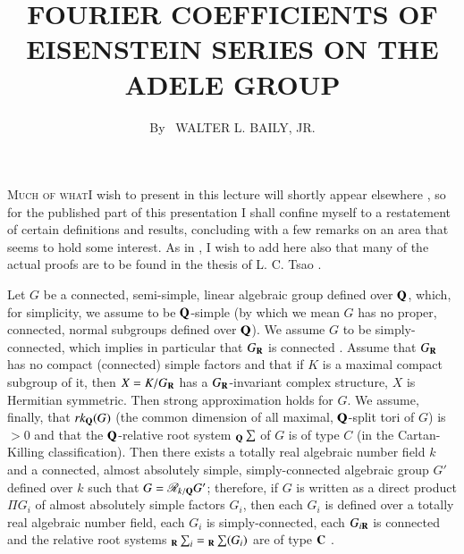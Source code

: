 \title{FOURIER COEFFICIENTS OF EISENSTEIN SERIES ON THE ADELE GROUP}

\author{By~ WALTER L. BAILY, JR.}

\date{}
\maketitle

\textsc{Much of what}\pageoriginale I wish to present in this lecture will shortly appear elsewhere \cite{art1-key3}, so for the published part of this presentation I shall confine myself to a restatement of certain definitions and results, concluding with a few remarks on an area that seems to hold some interest. As in \cite{art1-key3}, I wish to add here also that many of the actual proofs are to be found in the thesis of L. C. Tsao  \cite{art1-key8}.

Let $G$ be a connected, semi-simple, linear algebraic group defined over $\mathbf{Q}$, which, for simplicity, we assume to be $\mathbf{Q}$-simple (by which we mean $G$ has no proper, connected, normal subgroups defined over $\mathbf{Q}$). We assume $G$ to be simply-connected, which implies in particular that $G_{\mathbf{R}}$ is connected \citep[Ch. 7, \S 5]{art1-key}. Assume that $G_{\mathbf{R}}$ has no compact (connected) simple factors and that if $K$ is a maximal compact subgroup of it, then $X=K/G_{\mathbf{R}}$ has a $G_{\mathbf{R}}$-invariant complex structure, \iec $X$ is Hermitian symmetric. Then \cite{art1-key6} strong approximation holds for $G$. We assume, finally, that $rk_{\mathbf{Q}}(G)$ (the common dimension of all maximal, $\mathbf{Q}$-split tori of $G$) is $> 0$ and that the $\mathbf{Q}$-relative root system ${}_{\mathbf{Q}}\sum$ of $G$ is of type $C$ (in the Cartan-Killing classification). Then there exists a totally real algebraic number field $k$ and a connected, almost absolutely simple, simply-connected algebraic group $G'$ defined over $k$ such that $G=\mathscr{R}_{k/\mathbf{Q}}G'$; therefore, if $G$ is written as a direct product $\Pi G_i$ of almost absolutely simple factors $G_i$, then each $G_i$ is defined over a totally real algebraic number field, each $G_i$ is simply-connected, each $G_{i\mathbf{R}}$ is connected and the relative root systems ${}_{\mathbf{R}}\sum_i={}_{\mathbf{R}}\sum(G_i)$ are of type $\mathbf{C}$ \cite{art1-key4}.

